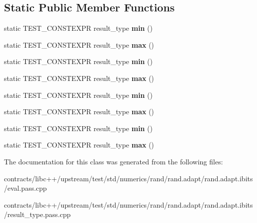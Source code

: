 \subsection*{Static Public Member Functions}
\begin{DoxyCompactItemize}
\item 
\mbox{\label{classrand1_a1742c6f3df92563b7cfb461a2363733c}} 
static T\+E\+S\+T\+\_\+\+C\+O\+N\+S\+T\+E\+X\+PR result\+\_\+type {\bfseries min} ()
\item 
\mbox{\label{classrand1_aa48a0345b9245eb782d1b12e8738dffb}} 
static T\+E\+S\+T\+\_\+\+C\+O\+N\+S\+T\+E\+X\+PR result\+\_\+type {\bfseries max} ()
\item 
\mbox{\label{classrand1_a1742c6f3df92563b7cfb461a2363733c}} 
static T\+E\+S\+T\+\_\+\+C\+O\+N\+S\+T\+E\+X\+PR result\+\_\+type {\bfseries min} ()
\item 
\mbox{\label{classrand1_aa48a0345b9245eb782d1b12e8738dffb}} 
static T\+E\+S\+T\+\_\+\+C\+O\+N\+S\+T\+E\+X\+PR result\+\_\+type {\bfseries max} ()
\item 
\mbox{\label{classrand1_a1742c6f3df92563b7cfb461a2363733c}} 
static T\+E\+S\+T\+\_\+\+C\+O\+N\+S\+T\+E\+X\+PR result\+\_\+type {\bfseries min} ()
\item 
\mbox{\label{classrand1_aa48a0345b9245eb782d1b12e8738dffb}} 
static T\+E\+S\+T\+\_\+\+C\+O\+N\+S\+T\+E\+X\+PR result\+\_\+type {\bfseries max} ()
\item 
\mbox{\label{classrand1_a1742c6f3df92563b7cfb461a2363733c}} 
static T\+E\+S\+T\+\_\+\+C\+O\+N\+S\+T\+E\+X\+PR result\+\_\+type {\bfseries min} ()
\item 
\mbox{\label{classrand1_aa48a0345b9245eb782d1b12e8738dffb}} 
static T\+E\+S\+T\+\_\+\+C\+O\+N\+S\+T\+E\+X\+PR result\+\_\+type {\bfseries max} ()
\end{DoxyCompactItemize}


The documentation for this class was generated from the following files\+:\begin{DoxyCompactItemize}
\item 
contracts/libc++/upstream/test/std/numerics/rand/rand.\+adapt/rand.\+adapt.\+ibits/eval.\+pass.\+cpp\item 
contracts/libc++/upstream/test/std/numerics/rand/rand.\+adapt/rand.\+adapt.\+ibits/result\+\_\+type.\+pass.\+cpp\end{DoxyCompactItemize}
